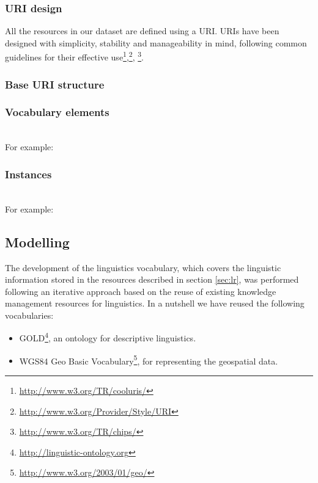 
\subsubsection{URI design}
All the resources in our dataset are defined using a URI. URIs have been designed with simplicity, stability and manageability in mind, following common guidelines for their effective use\footnote{\url{http://www.w3.org/TR/cooluris/}},\footnote{\url{http://www.w3.org/Provider/Style/URI}}, \footnote{\url{http://www.w3.org/TR/chips/}}. 

\subsubsection{Base URI structure}

\noindent{}

\subsubsection{Vocabulary elements}

\noindent{} \\

\noindent For example: \\

\subsubsection{Instances}

\noindent{}\\

\noindent For example: \\

\subsection{Modelling}
The development of the linguistics vocabulary, which covers the linguistic information stored in the resources described in section \ref{sec:lr}, was performed following an iterative approach based on the reuse of existing knowledge management resources for linguistics. In a nutshell we have reused the following vocabularies: 
\begin{itemize}
	\item GOLD\footnote{\url{http://linguistic-ontology.org}}, an ontology for descriptive linguistics.
	\item WGS84 Geo Basic Vocabulary\footnote{\url{http://www.w3.org/2003/01/geo/}}, for representing the geospatial data.	 
\end{itemize} 

